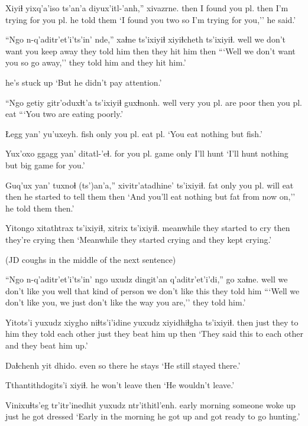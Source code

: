 \documentclass[12pt]{article}
\begin{document}
\gll Xiyiɬ yixq'a'iso ts'an'a diyux'itl-'anh,'' xivazrne.
then {I found you pl.} then {I'm trying for you pl.} {he told them}
\glt `I found you two so I'm trying for you,'' he said.'
\glend

\gll ``Ngo n-q'aditr'et'i'ts'in' nde,'' xaɬne ts'ixiyiɬ xiyiɬcheth ts'ixiyiɬ. 
well {we don't want you} {keep away} {they told him} then {they hit him} then
\glt ```Well we don't want you so go away,'' they told him and they hit him.'
\glend

{{he's stuck up}}
\glt `But he didn't pay attention.'
\glend

\gll ``Ngo getiy gitr'oduxɬt'a ts'ixiyiɬ guxɬnonh.
well very {you pl. are poor} then {you pl. eat}
\glt ```You two are eating poorly.'
\glend

\gll Łegg yan' yu'uxeyh.
fish only {you pl. eat pl.}
\glt `You eat nothing but fish.'
\glend

\gll Yux'oxo ggagg yan' ditatl-'eɬ.
{for you pl.} game only {I'll hunt}
\glt `I'll hunt nothing but big game for you.'
\glend

\gll Guq'ux yan' tuxnoɬ (ts')an'a,'' xivitr'atadhine' ts'ixiyiɬ.
fat only {you pl. will eat} then {he started to tell them} then
\glt `And you'll eat nothing but fat from now on,'' he told them then.'
\glend

\gll Yitongo xitathtrax ts'ixiyiɬ, xitrix ts'ixiyiɬ.
meanwhile {they started to cry} then {they're crying} then
\glt `Meanwhile they started crying and they kept crying.'
\glend

(JD coughs in the middle of the next sentence)

\gll ``Ngo n-q'aditr'et'i'ts'in' ngo {uxudz dingit'an} q'aditr'et'i'di,'' go xaɬne.
well {we don't like you} well  {that kind of person} {we don't like} this {they told him}
\glt ```Well we don't like you, we just don't like the way you are,'' they told him.'
\glend

\gll Yitots'i yuxudz xiygho niɬts'i'idine yuxudz xiyidhiɬgha ts'ixiyiɬ.
then just  {they to him} {they told each other} just {they beat him up} then
\glt `They said this to each other and they beat him up.'
\glend

\gll Daɬchenh yit dhido.
{even so} there {he stays}
\glt `He still stayed there.'
\glend

\gll Tthantithdogits'i xiyiɬ.
{he won't leave} then
\glt `He wouldn't leave.'
\glend

\gll Vinixuɬts'eg tr'itr'inedhit yuxudz ntr'ithitl'enh.
{early morning} {someone woke up} just {he got dressed}
\glt `Early in the morning he got up and got ready to go hunting.'
\glend
\end{document}
